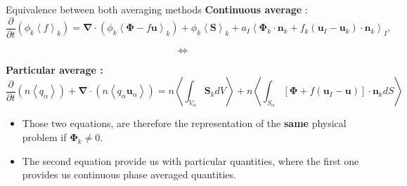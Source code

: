 \documentclass{sintefbeamer}
\newcommand{\kavg}[1]{\left<#1\right>_k}
\newcommand{\Iavg}[1]{\left<#1\right>_I}
\newcommand{\pavg}[1]{n \left<#1\right>}
\newcommand{\nablab}{\bm{\nabla}}
\newcommand{\pddt}{\frac{\partial}{\partial t}}
\begin{document}
\begin{frame}{Equivalence between both averaging methods}
  \textbf{Continuous average} :
  \begin{equation*}
      \pddt (\phi_k\kavg{f})
      = \nablab \cdot \left(
          \phi_k \kavg{\bm{\Phi} - f \textbf{u}}
      \right)
      + \phi_k \kavg{\textbf{S}}
      + a_I \Iavg{
          \bm{\Phi}_k \cdot \textbf{n}_k
          + f_k 
          \left(
              \textbf{u}_I
              - \textbf{u}_k
          \right) \cdot \textbf{n}_k
      },
      \label{eq:avg_k_global}
  \end{equation*}

  \begin{center}
    \begin{equation*}
      \Longleftrightarrow 
    \end{equation*}
  \end{center}
  \textbf{Particular average :}
  \begin{equation*}
    \pddt   \left(\pavg{q_\alpha}\right)
    + \nablab \cdot \left(\pavg{q_\alpha \textbf{u}_\alpha}\right) 
    = \pavg{\int_{V_\alpha} \textbf{S}_k dV}
    + \pavg{\int_{S_\alpha} \left[\bm{\Phi} + f (\textbf{u}_I-\textbf{u}) \right] \cdot \textbf{n}_k d S}
    \label{eq:avg_p_global}
\end{equation*}
\begin{itemize}
  \item Those two equations, are therefore the representation of the \textbf{same} physical problem if $\bm{\Phi}_k \neq 0$.
  \item The second equation provide us with particular quantities, where the first one provides us continuous phase averaged quantities. 
\end{itemize}
\end{frame}
\end{document}
